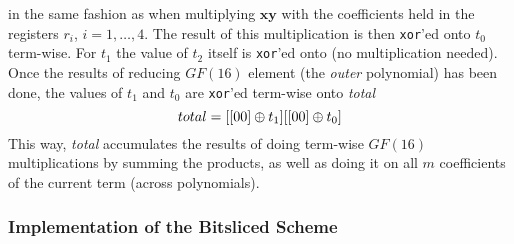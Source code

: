 in the same fashion as when multiplying $\textbf{xy}$ with the coefficients held in the registers $r_i$, $i = 1,\dots, 4$. The result of this multiplication is then \texttt{xor}'ed onto $t_0$ term-wise. For $t_1$ the value of $t_2$ itself is \texttt{xor}'ed onto (no multiplication needed).\medskip\\
Once the results of reducing $GF(16)$ element (the \textit{outer} polynomial) has been done, the values of $t_1$ and $t_0$ are \texttt{xor}'ed term-wise onto \textit{total}
$$
    total = [[00] \oplus t_1] [[00] \oplus t_0]
$$
This way, \textit{total} accumulates the results of doing term-wise $GF(16)$ multiplications by summing the products, as well as doing it on all $m$ coefficients of the current term (across polynomials).
\subsubsection{Implementation of the Bitsliced Scheme} \label{bitslice:implementation}